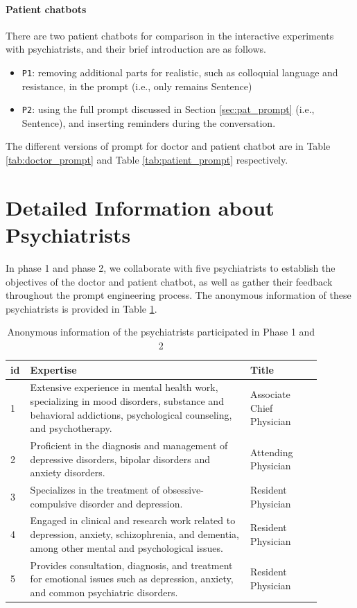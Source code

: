\paragraph{Patient chatbots}
There are two patient chatbots for comparison in the interactive experiments with psychiatrists, and their brief introduction are as follows.
\begin{itemize}
    \item \texttt{P1}: removing additional parts for realistic, such as colloquial language and resistance, in the prompt (i.e., only remains Sentence)
    \item \texttt{P2}: 
    using the full prompt discussed in Section \ref{sec:pat_prompt} (i.e., Sentence), and inserting reminders during the conversation.
\end{itemize}

The different versions of prompt for doctor and patient chatbot are in Table \ref{tab:doctor_prompt} and Table \ref{tab:patient_prompt} respectively.

\section{Detailed Information about Psychiatrists}
\label{apd:psych_info}
In phase 1 and phase 2, we collaborate with five psychiatrists to establish the objectives of the doctor and patient chatbot, as well as gather their feedback throughout the prompt engineering process. The anonymous information of these psychiatrists is provided in Table \ref{tab:psych_info}.

\begin{table}[th]
    \small
    \centering
    \begin{tabular}{m{0.03\linewidth}m{0.65\linewidth}m{0.21\linewidth}}
    \hline
     id & Expertise & Title  \\ 
    \hline
    1 & Extensive experience in mental health work, specializing in mood disorders, substance and behavioral addictions, psychological counseling, and psychotherapy. & Associate Chief Physician \\
    \hline
    2 & Proficient in the diagnosis and management of depressive disorders, bipolar disorders and anxiety disorders. & Attending Physician\\
    \hline
    3 & Specializes in the treatment of obsessive-compulsive disorder and depression. & Resident Physician\\
    \hline
    4 & Engaged in clinical and research work related to depression, anxiety, schizophrenia, and dementia, among other mental and psychological issues. & Resident Physician \\
    \hline
    5 & Provides consultation, diagnosis, and treatment for emotional issues such as depression, anxiety, and common psychiatric disorders. & Resident Physician\\
    \hline
    \end{tabular}
    \caption{Anonymous information of the psychiatrists participated in Phase 1 and 2}
    \label{tab:psych_info}
\end{table}

